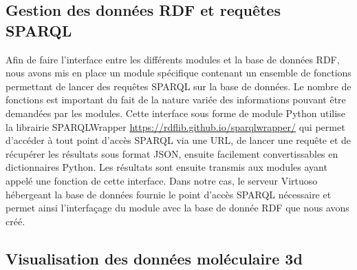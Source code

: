 \subsection{Gestion des données RDF et requêtes SPARQL}

Afin de faire l'interface entre les différents modules et la base de données RDF, nous avons mis en place un module spécifique contenant un ensemble de fonctions permettant de lancer des requêtes SPARQL sur la base de données. Le nombre de fonctions est important du fait de la nature variée des informations pouvant être demandées par les modules. Cette interface sous forme de module Python utilise la librairie SPARQLWrapper \url{https://rdflib.github.io/sparqlwrapper/} qui permet d'accéder à tout point d'accès SPARQL via une URL, de lancer une requête et de récupérer les résultats sous format JSON, ensuite facilement convertissables en dictionnaires Python. Les résultats sont ensuite transmis aux modules ayant appelé une fonction de cette interface. Dans notre cas, le serveur Virtuoso hébergeant la base de données fournie le point d'accès SPARQL nécessaire et permet ainsi l'interfaçage du module avec la base de donnée RDF que nous avons créé.

\subsection{Visualisation des données moléculaire 3d}


